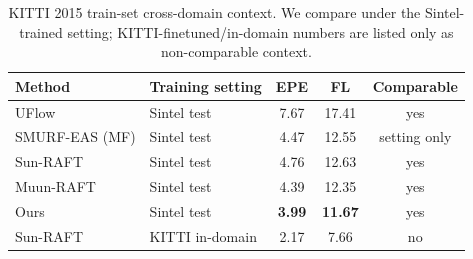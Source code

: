 \begin{table}[t]
\centering
\caption{KITTI 2015 train-set cross-domain context. We compare under the Sintel-trained setting; KITTI-finetuned/in-domain numbers are listed only as non-comparable context.}
\label{tab:kitti_context}
\begin{tabular}{llccc}
\toprule
Method & Training setting & EPE & FL & Comparable \\
\midrule
UFlow & Sintel test & 7.67 & 17.41 & yes \\
SMURF-EAS (MF) & Sintel test & 4.47 & 12.55 & setting only \\
Sun-RAFT & Sintel test & 4.76 & 12.63 & yes \\
Muun-RAFT & Sintel test & 4.39 & 12.35 & yes \\
Ours & Sintel test & \textbf{3.99} & \textbf{11.67} & yes \\
Sun-RAFT & KITTI in-domain & 2.17 & 7.66 & no \\
\bottomrule
\end{tabular}
\end{table}

